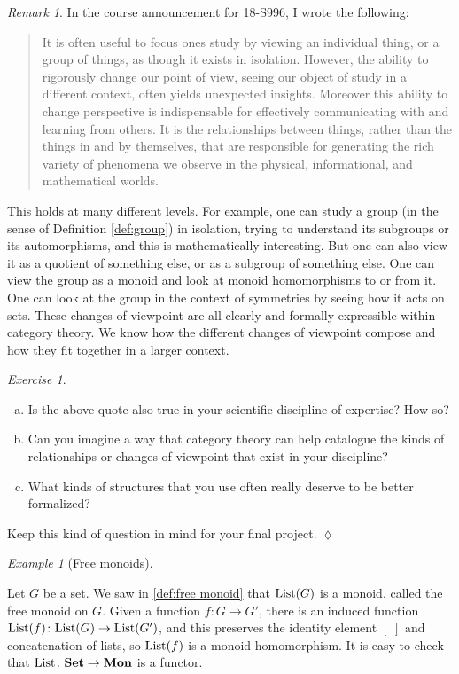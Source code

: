 \documentclass{book}
\def\tn{\textnormal}
\def\List{\tn{List}}
\def\to{\rightarrow}
\def\taking{\colon}
\def\Mon{{\bf Mon}}
\def\Set{{\bf Set}}
\theoremstyle{remark}
\newtheorem{remark}[subsubsection]{Remark}
\newtheorem{example}[subsubsection]{Example}
\newtheorem{exc}[subsubsection]{Exercise}
\newenvironment{exercise}{\begin{exc}}{\hspace*{\fill}$\lozenge$\end{exc}}
\theoremstyle{definition}
\def\sexc{\begin{enumerate}[a.)]\setlength{\itemsep}{.1cm}\setlength{\parskip}{.1cm}\item}
\def\next{\item}
\def\endsexc{\end{enumerate}}
\begin{document}
\begin{remark}

In the course announcement for 18-S996, I wrote the following:
\begin{quote}
It is often useful to focus ones study by viewing an individual thing, or a group of things, as though it exists in isolation. However, the ability to rigorously change our point of view, seeing our object of study in a different context, often yields unexpected insights. Moreover this ability to change perspective is indispensable for effectively communicating with and learning from others. It is the relationships between things, rather than the things in and by themselves, that are responsible for generating the rich variety of phenomena we observe in the physical, informational, and mathematical worlds.
\end{quote}
This holds at many different levels. For example, one can study a group (in the sense of Definition \ref{def:group}) in isolation, trying to understand its subgroups or its automorphisms, and this is mathematically interesting. But one can also view it as a quotient of something else, or as a subgroup of something else. One can view the group as a monoid and look at monoid homomorphisms to or from it. One can look at the group in the context of symmetries by seeing how it acts on sets. These changes of viewpoint are all clearly and formally expressible within category theory. We know how the different changes of viewpoint compose and how they fit together in a larger context. 

\end{remark}

\begin{exercise}~
\sexc Is the above quote also true in your scientific discipline of expertise? How so? 
\next Can you imagine a way that category theory can help catalogue the kinds of relationships or changes of viewpoint that exist in your discipline? 
\next What kinds of structures that you use often really deserve to be better formalized?
\endsexc
Keep this kind of question in mind for your final project.
\end{exercise}

\begin{example}[Free monoids]\label{ex:free monoid}

Let $G$ be a set. We saw in \ref{def:free monoid} that $\List(G)$ is a monoid, called the free monoid on $G$. Given a function $f\taking G\to G'$, there is an induced function $\List(f)\taking\List(G)\to\List(G')$, and this preserves the identity element $[\;]$ and concatenation of lists, so $\List(f)$ is a monoid homomorphism. It is easy to check that $\List\taking\Set\to\Mon$\index{a functor!$\Set\to\Mon$} is a functor.

\end{example}
\end{document}
